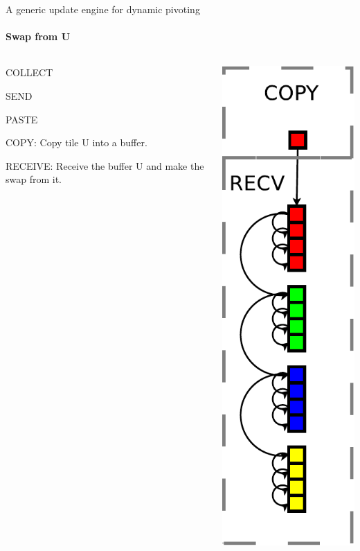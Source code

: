 \begin{frame}{A generic update engine for dynamic pivoting}
\framesubtitle{Swap from U}
\begin{columns}
\begin{column}{.60\textwidth}
\begin{itemize}
{
\item COLLECT
\item SEND
\item PASTE
}
\item COPY: Copy tile U into a buffer.
\item RECEIVE: Receive the buffer U and make the swap from it.
\end{itemize}
\end{column}
\hfill
\begin{column}{.40\textwidth}
\begin{center}
\includegraphics[scale=0.3]{receive.pdf}
\end{center}
\end{column}
\end{columns}
\end{frame}

